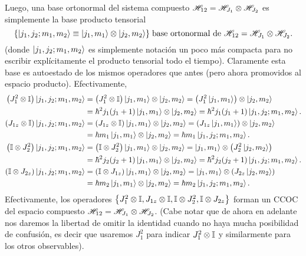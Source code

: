\documentclass[10pt, a4paper]{article}
\numberwithin{equation}{subsection}
\begin{document}
Luego, una base ortonormal del sistema compuesto $\mathscr{H}_{12} =
\mathscr{H}_{J_1}\otimes\mathscr{H}_{J_2}$ es simplemente la base producto tensorial
\begin{equation}
  \set{\ket{j_1,j_2;m_1,m_2} \eqdef \ket{j_1,m_1}\tensor\ket{j_2,m_2}}
  \; \text{base ortonormal de } \Hilbert_{12} =
  \Hilbert_{J_1}\tensor\Hilbert_{J_2}.
\end{equation}
(donde $\ket{j_1,j_2;m_1,m_2}$ es simplemente notación un poco más compacta
para no escribir explícitamente el producto tensorial todo el tiempo).
Claramente esta base es autoestado de los mismos operadores que antes (pero
ahora promovidos al espacio producto). Efectivamente,
\begin{align}
  \left(J_1^2\otimes\mathbb{I}\right)\ket{j_1,j_2;m_1,m_2} &=
    \left(J_1^2\otimes\mathbb{I}\right)\ket{j_1,m_1}\otimes\ket{j_2,m_2} =
    \left(J_1^2\ket{j_1,m_1}\right)\otimes\ket{j_2,m_2} \\
  &= \hbar^2j_1(j_1+1)\ket{j_1,m_1}\otimes\ket{j_2,m_2} =
    \hbar^2j_1(j_1+1)\ket{j_1,j_2;m_1,m_2}. \\
  \left(J_{1z}\otimes\mathbb{I}\right)\ket{j_1,j_2;m_1,m_2} &=
    \left(J_{1z}\otimes\mathbb{I}\right)\ket{j_1,m_1}\otimes\ket{j_2,m_2} =
    \left(J_{1z}\ket{j_1,m_1}\right)\otimes\ket{j_2,m_2} \\
  &= \hbar m_1\ket{j_1,m_1}\otimes\ket{j_2,m_2} =
    \hbar m_1\ket{j_1,j_2;m_1,m_2}. \\
  \left(\mathbb{I}\otimes J_2^2\right)\ket{j_1,j_2;m_1,m_2} &=
    \left(\mathbb{I}\otimes J_2^2\right)\ket{j_1,m_1}\otimes\ket{j_2,m_2} =
    \ket{j_1,m_1}\otimes\left(J_2^2\ket{j_2,m_2}\right) \\
  &= \hbar^2j_2(j_2+1)\ket{j_1,m_1}\otimes\ket{j_2,m_2} =
    \hbar^2j_2(j_2+1)\ket{j_1,j_2;m_1,m_2}. \\
  \left(\mathbb{I}\otimes J_{2z}\right)\ket{j_1,j_2;m_1,m_2} &=
    \left(\mathbb{I}\otimes J_{1z}\right)\ket{j_1,m_1}\otimes\ket{j_2,m_2} =
    \ket{j_1,m_1}\otimes\left(J_{2z}\ket{j_2,m_2}\right) \\
  &= \hbar m_2\ket{j_1,m_1}\otimes\ket{j_2,m_2} =
    \hbar m_2\ket{j_1,j_2;m_1,m_2}.
\end{align}
Efectivamente, los operadores $\set{J_1^2\tensor\Id, J_{1z}\tensor\Id,
\Id\tensor J_2^2, \Id\tensor J_{2z}}$ forman un CCOC del espacio compuesto
$\mathscr{H}_{12} = \mathscr{H}_{J_1}\otimes\mathscr{H}_{J_2}$. (Cabe notar que de ahora
en adelante nos daremos la libertad de omitir la identidad cuando no haya
mucha posibilidad de confusión, es decir que usaremos $J_1^2$ para indicar
$J_1^2\otimes\mathbb{I}$ y similarmente para los otros observables).
\end{document}

